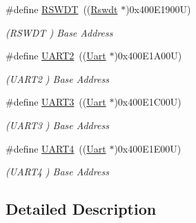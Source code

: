 \begin{DoxyCompactItemize}
\mbox{\label{group__SAME70J20__base_ga4efdb974edf009cb6dbb3e9fadcf28a0}} 
\#define \mbox{\hyperlink{group__SAME70J20__base_ga4efdb974edf009cb6dbb3e9fadcf28a0}{R\+S\+W\+DT}}~((\mbox{\hyperlink{structRswdt}{Rswdt}}  $\ast$)0x400\+E1900\+U)
\begin{DoxyCompactList}\small\item\em (R\+S\+W\+DT ) Base Address \end{DoxyCompactList}\item 
\mbox{\label{group__SAME70J20__base_ga7f6bd6eb89ae2eeae97af4207ebe3cde}} 
\#define \mbox{\hyperlink{group__SAME70J20__base_ga7f6bd6eb89ae2eeae97af4207ebe3cde}{U\+A\+R\+T2}}~((\mbox{\hyperlink{structUart}{Uart}}   $\ast$)0x400\+E1\+A00\+U)
\begin{DoxyCompactList}\small\item\em (U\+A\+R\+T2 ) Base Address \end{DoxyCompactList}\item 
\mbox{\label{group__SAME70J20__base_ga961726a611b38bcaf61f3d598b0a59ec}} 
\#define \mbox{\hyperlink{group__SAME70J20__base_ga961726a611b38bcaf61f3d598b0a59ec}{U\+A\+R\+T3}}~((\mbox{\hyperlink{structUart}{Uart}}   $\ast$)0x400\+E1\+C00\+U)
\begin{DoxyCompactList}\small\item\em (U\+A\+R\+T3 ) Base Address \end{DoxyCompactList}\item 
\mbox{\label{group__SAME70J20__base_ga7c035f6f443c999fc043b2b7fb598800}} 
\#define \mbox{\hyperlink{group__SAME70J20__base_ga7c035f6f443c999fc043b2b7fb598800}{U\+A\+R\+T4}}~((\mbox{\hyperlink{structUart}{Uart}}   $\ast$)0x400\+E1\+E00\+U)
\begin{DoxyCompactList}\small\item\em (U\+A\+R\+T4 ) Base Address \end{DoxyCompactList}\end{DoxyCompactItemize}


\subsection{Detailed Description}
